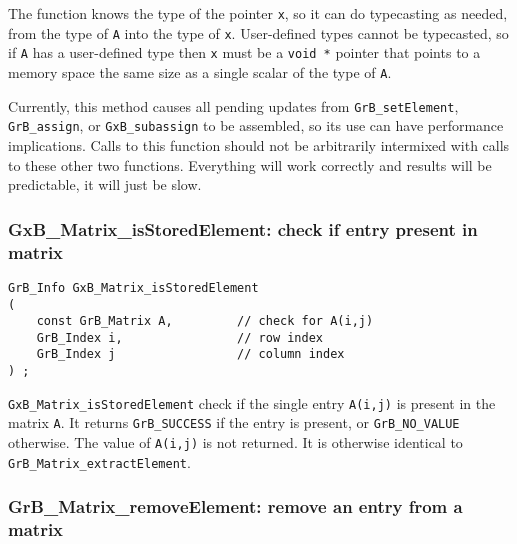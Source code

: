 \documentclass[12pt]{article}
\begin{document}
The function knows the type of the pointer \verb'x', so it can do typecasting
as needed, from the type of \verb'A' into the type of \verb'x'.  User-defined
types cannot be typecasted, so if \verb'A' has a user-defined type then
\verb'x' must be a \verb'void *' pointer that points to a memory space the same
size as a single scalar of the type of \verb'A'.

Currently, this method causes all pending updates from
\verb'GrB_setElement', \verb'GrB_assign', or \verb'GxB_subassign' to be
assembled, so its use can have performance implications.  Calls to this
function should not be arbitrarily intermixed with calls to these other two
functions.  Everything will work correctly and results will be predictable, it
will just be slow.

\newpage
\subsubsection{{\sf GxB\_Matrix\_isStoredElement:} check if entry present in matrix}
\label{matrix_isStoredElement}

\begin{mdframed}[userdefinedwidth=6in]
{\footnotesize
\begin{verbatim}
GrB_Info GxB_Matrix_isStoredElement
(
    const GrB_Matrix A,         // check for A(i,j)
    GrB_Index i,                // row index
    GrB_Index j                 // column index
) ;
\end{verbatim} } \end{mdframed}

\verb'GxB_Matrix_isStoredElement' check if the single entry \verb'A(i,j)' is
present in the matrix \verb'A'.  It returns \verb'GrB_SUCCESS' if the entry is
present, or \verb'GrB_NO_VALUE' otherwise.  The value of \verb'A(i,j)' is not
returned. It is otherwise identical to \verb'GrB_Matrix_extractElement'.

\subsubsection{{\sf GrB\_Matrix\_removeElement:} remove an entry from a matrix}
\label{matrix_removeElement}
\end{document}
